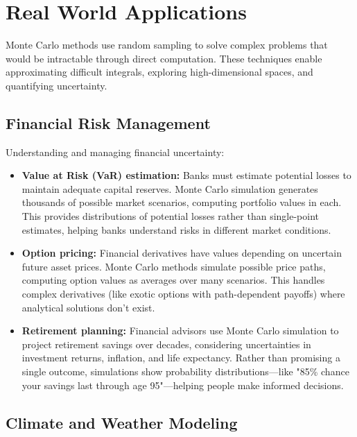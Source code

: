 
\section{Real World Applications}
\label{sec:monte-carlo-real-world}


Monte Carlo methods use random sampling to solve complex problems that would be intractable through direct computation. These techniques enable approximating difficult integrals, exploring high-dimensional spaces, and quantifying uncertainty.

\subsection{Financial Risk Management}

Understanding and managing financial uncertainty:

\begin{itemize}
    \item \textbf{Value at Risk (VaR) estimation:} Banks must estimate potential losses to maintain adequate capital reserves. Monte Carlo simulation generates thousands of possible market scenarios, computing portfolio values in each. This provides distributions of potential losses rather than single-point estimates, helping banks understand risks in different market conditions.
    
    \item \textbf{Option pricing:} Financial derivatives have values depending on uncertain future asset prices. Monte Carlo methods simulate possible price paths, computing option values as averages over many scenarios. This handles complex derivatives (like exotic options with path-dependent payoffs) where analytical solutions don't exist.
    
    \item \textbf{Retirement planning:} Financial advisors use Monte Carlo simulation to project retirement savings over decades, considering uncertainties in investment returns, inflation, and life expectancy. Rather than promising a single outcome, simulations show probability distributions—like "85\% chance your savings last through age 95"—helping people make informed decisions.
\end{itemize}

\subsection{Climate and Weather Modeling}


